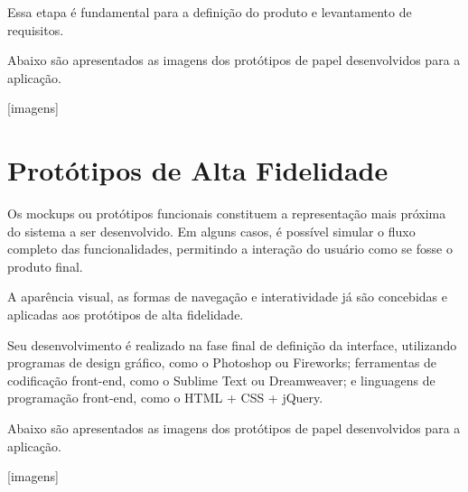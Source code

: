 		Essa etapa é fundamental para a definição do produto e levantamento de requisitos.

		Abaixo são apresentados as imagens dos protótipos de papel desenvolvidos para a aplicação.

		\newpage

		[imagens]


	\section[Protótipos de Alta Fidelidade]{Protótipos de Alta Fidelidade}
	\label{sec:prototipos_alta}

		Os mockups ou protótipos funcionais constituem a representação mais próxima do sistema a ser desenvolvido. Em alguns casos, é possível simular o fluxo completo das funcionalidades, permitindo a interação do usuário como se fosse o produto final.

		A aparência visual, as formas de navegação e interatividade já são concebidas e aplicadas aos protótipos de alta fidelidade.

		Seu desenvolvimento é realizado na fase final de definição da interface, utilizando programas de design gráfico, como o Photoshop ou Fireworks; ferramentas de codificação front-end, como o Sublime Text ou Dreamweaver; e linguagens de programação front-end, como o HTML + CSS + jQuery.

		Abaixo são apresentados as imagens dos protótipos de papel desenvolvidos para a aplicação.

		\newpage

		[imagens]
